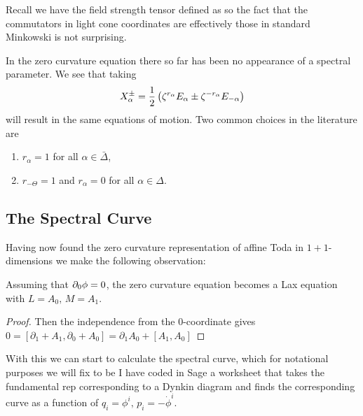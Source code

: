 \documentclass{article}
\begin{document}
\begin{remark}
Recall we have the field strength tensor defined as 
so the fact that the commutators in light cone coordinates are effectively those in standard Minkowski is not surprising. 
\end{remark}

\begin{remark}
	In the zero curvature equation there so far has been no appearance of a spectral parameter. We see that
	taking
	$$X_\alpha\sp\pm = \frac12\left( \zeta\sp{r_\alpha} E_\alpha \pm \zeta\sp{-r_\alpha} E_{-\alpha}\right)$$
	will result in the same equations of motion. Two common choices in the literature are
	\begin{enumerate}
		\item $r_\alpha=1$ for all $\alpha\in\bar\Delta$,
		\item $r_{-\Theta}=1$ and $r_\alpha=0$ for all $\alpha\in\Delta$.
	\end{enumerate}
\end{remark}

\subsection{The Spectral Curve}
Having now found the zero curvature representation of affine Toda in $1+1$-dimensions we make the following observation:

\begin{prop}
	Assuming that $\partial_0 \phi = 0$, the zero curvature equation becomes a Lax equation with $L=A_0, \, M = A_1$.
\end{prop}
\begin{proof}
Then the independence
from the $0$-coordinate gives
$0=[\partial_1+A_1, \partial_0+A_0]= \partial_1 A_0 +[A_1, A_0]$	
\end{proof}

With this we can start to calculate the spectral curve, which for notational purposes we will fix to be 
I have coded in Sage a worksheet that takes the fundamental rep corresponding to a Dynkin diagram and finds the corresponding curve as a function of $q_i = \phi^i, \, p_i = -\dot{\phi}^i$.
\end{document}
